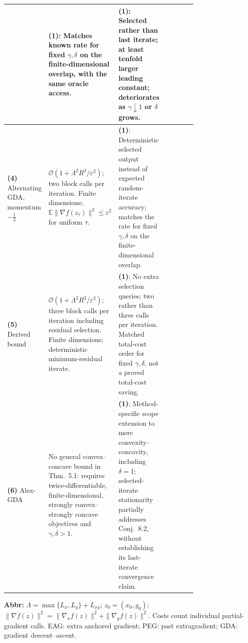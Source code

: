 \begin{table}[tp]
\begin{threeparttable}
\begin{tabularx}{\linewidth}{@{}>{\raggedright\arraybackslash}p{0.20\linewidth}>{\raggedright\arraybackslash}p{0.32\linewidth}>{\raggedright\arraybackslash}p{0.25\linewidth}>{\raggedright\arraybackslash}X@{}}
& \textbf{(1)}: Matches known rate for fixed $\gamma,\delta$ on the finite-dimensional overlap, with the same oracle access.
& \textbf{(1)}: Selected rather than last iterate; at least tenfold larger leading constant; deteriorates as $\gamma\downarrow1$ or $\delta$ grows. \\
\midrule
\textbf{(4)} Alternating GDA, momentum $-\tfrac12$ \citep[Thm.~3.1]{bscShugart2026v1}
& $\mathcal{O}(1+\Lambda^2R^2/\varepsilon^2)$; two block calls per iteration. Finite dimensions; $\mathbb{E}\|\nabla f(z_\tau)\|^2\le\varepsilon^2$ for uniform $\tau$.
& \textbf{(1)}: Deterministic selected output instead of expected random-iterate accuracy; matches the rate for fixed $\gamma,\delta$ on the finite-dimensional overlap.
& \\
\midrule
\textbf{(5)} Derived bound \citep[Thm.~3.1]{bscShugart2026v1}
& $\mathcal{O}(1+\Lambda^2R^2/\varepsilon^2)$; three block calls per iteration including residual selection. Finite dimensions; deterministic minimum-residual iterate.
& \textbf{(1)}: No extra selection queries; two rather than three calls per iteration. Matched total-cost order for fixed $\gamma,\delta$, not a proved total-cost saving.
& \\
\midrule
\textbf{(6)} Alex-GDA \citep[Thm.~5.1; Conj.~8.2]{bscLee2024v2}
& No general convex--concave bound in Thm.~5.1: requires twice-differentiable, finite-dimensional, strongly convex--strongly concave objectives and $\gamma,\delta>1$.
& \textbf{(1)}: Method-specific scope extension to mere convexity--concavity, including $\delta=1$; selected-iterate stationarity partially addresses Conj.~8.2, without establishing its last-iterate convergence claim.
& \\
\bottomrule
\end{tabularx}
\begin{tablenotes}[flushleft]\footnotesize
\item[] \textbf{Abbr:} $\Lambda=\max\{L_x,L_y\}+L_{xy}$; $z_0=(x_0,y_0)$; $\|\nabla f(z)\|^2=\|\nabla_x f(z)\|^2+\|\nabla_y f(z)\|^2$. Costs count individual partial-gradient calls. EAG: extra anchored gradient; PEG: past extragradient; GDA: gradient descent--ascent.
\end{tablenotes}
\end{threeparttable}
\end{table}
\clearpage
